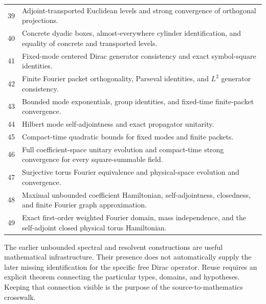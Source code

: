 \begin{longtable}{@{}p{}p{}@{}}
39 & Adjoint-transported Euclidean levels and strong convergence of orthogonal projections.\\[2pt]
40 & Concrete dyadic boxes, almost-everywhere cylinder identification, and equality of concrete and transported levels.\\[2pt]
41 & Fixed-mode centered Dirac generator consistency and exact symbol-square identities.\\[2pt]
42 & Finite Fourier packet orthogonality, Parseval identities, and \(L^2\) generator consistency.\\[2pt]
43 & Bounded mode exponentials, group identities, and fixed-time finite-packet convergence.\\[2pt]
44 & Hilbert mode self-adjointness and exact propagator unitarity.\\[2pt]
45 & Compact-time quadratic bounds for fixed modes and finite packets.\\[2pt]
46 & Full coefficient-space unitary evolution and compact-time strong convergence for every square-summable field.\\[2pt]
47 & Surjective torus Fourier equivalence and physical-space evolution and convergence.\\[2pt]
48 & Maximal unbounded coefficient Hamiltonian, self-adjointness, closedness, and finite Fourier graph approximation.\\[2pt]
49 & Exact first-order weighted Fourier domain, mass independence, and the self-adjoint closed physical torus Hamiltonian.\\
\bottomrule
\end{longtable}

The earlier unbounded spectral and resolvent constructions are useful mathematical infrastructure. Their presence does not automatically supply the later missing identification for the specific free Dirac operator. Reuse requires an explicit theorem connecting the particular types, domains, and hypotheses. Keeping that connection visible is the purpose of the source-to-mathematics crosswalk.
